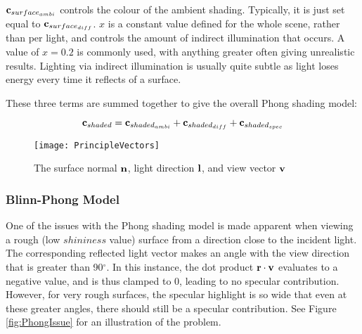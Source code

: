 \begin{math}\mathbf{c}_{surface_{ambi}}\end{math} controls the colour of the ambient shading. Typically, it is just set equal to \begin{math}\mathbf{c}_{surface_{diff}}\end{math}. \begin{math}x\end{math} is a constant value defined for the whole scene, rather than per light, and controls the amount of indirect illumination that occurs. A value of \begin{math}x = 0.2\end{math} is commonly used, with anything greater often giving unrealistic results. Lighting via indirect illumination is usually quite subtle as light loses energy every time it reflects of a surface.

These three terms are summed together to give the overall Phong shading model:

\begin{equation}
	\mathbf{c}_{shaded} = \mathbf{c}_{shaded_{ambi}} + \mathbf{c}_{shaded_{diff}} + \mathbf{c}_{shaded_{spec}}
\end{equation}

\begin{figure}[h]
	\centering
	\texttt{[image: PrincipleVectors]}
	\caption{The surface normal \begin{math}\mathbf{n}\end{math}, light direction \begin{math}\mathbf{l}\end{math}, and view vector \begin{math}\mathbf{v}\end{math}~\cite{RTR4}}
	\label{fig:PrincipleVectors}
\end{figure}

\subsubsection{Blinn-Phong Model}

One of the issues with the Phong shading model is made apparent when viewing a rough (low \begin{math}shininess\end{math} value) surface from a direction close to the incident light. The corresponding reflected light vector makes an angle with the view direction that is greater than 90$^{\circ}$. In this instance, the dot product \begin{math}\mathbf{r}\cdot\mathbf{v}\end{math} evaluates to a negative value, and is thus clamped to 0, leading to no specular contribution. However, for very rough surfaces, the specular highlight is so wide that even at these greater angles, there should still be a specular contribution. See Figure \ref{fig:PhongIssue} for an illustration of the problem.

